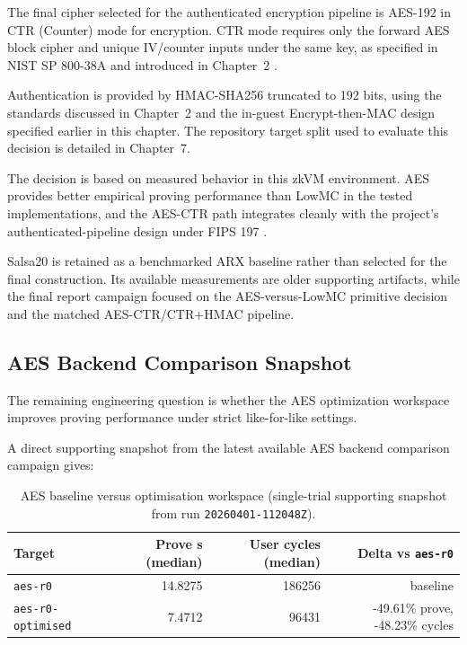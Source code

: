 The final cipher selected for the authenticated encryption pipeline is
AES-192 in CTR (Counter) mode for encryption. CTR mode requires only the forward
AES block cipher and unique IV/counter inputs under the same key, as specified in
NIST SP 800-38A and introduced in Chapter~2 \cite{nistsp80038a}.

Authentication is provided by HMAC-SHA256 truncated to 192 bits, using the
standards discussed in Chapter~2 and the in-guest Encrypt-then-MAC design
specified earlier in this chapter. The repository target split used to evaluate
this decision is detailed in Chapter~7.

The decision is based on measured behavior in this zkVM environment. AES
provides better empirical proving performance than LowMC in the tested
implementations, and the AES-CTR path integrates cleanly with the project's
authenticated-pipeline design under FIPS 197 \cite{nistfips197}.

Salsa20 is retained as a benchmarked ARX baseline rather than selected for the
final construction. Its available measurements are older supporting artifacts,
while the final report campaign focused on the AES-versus-LowMC primitive
decision and the matched AES-CTR/CTR+HMAC pipeline.

\subsection{AES Backend Comparison Snapshot}

The remaining engineering question is whether the AES optimization workspace
improves proving performance under strict like-for-like settings.

A direct supporting snapshot from the latest available AES backend comparison
campaign gives:

\begin{table}[H]
\centering
\reporttablesetup
\begin{tabular*}{\textwidth}{@{\extracolsep{\fill}}lrrr@{}}
\hline
Target & Prove s (median) & User cycles (median) & Delta vs \texttt{aes-r0} \\
\hline
\texttt{aes-r0} & 14.8275 & 186256 & baseline \\
\texttt{aes-r0-optimised} & 7.4712 & 96431 & -49.61\% prove, -48.23\% cycles \\
\hline
\end{tabular*}
\caption{AES baseline versus optimisation workspace (single-trial supporting
snapshot from run \texttt{20260401-112048Z}).}
\label{tab:aes-backend-snapshot}
\end{table}

